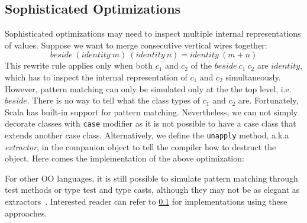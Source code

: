 \subsection{Sophisticated Optimizations}
Sophisticated optimizations may need to inspect multiple internal
representations of values.
Suppose we want to merge consecutive vertical wires together:
$$
beside\ (identity\ m)\ (identity\ n) = identity\ (m + n)
$$
This rewrite rule applies only when both $c_1$ and $c_2$ of the $beside\ c_1\ c_2$
are $identity$, which has to inspect the internal representation of $c_1$ and $c_2$ simultaneously.
However, pattern matching can only be simulated only at the the top level, i.e. $beside$.
There is no way to tell what the class types of $c_1$ and $c_2$ are.
Fortunately, Scala has built-in support for pattern matching. Nevertheless, we
can not simply decorate classes with \lstinline{case} modifier as
it is not possible to have a case class that extends another case class.
Alternatively, we define the \lstinline{unapply} method, a.k.a \emph{extractor}, in the companion object
to tell the compiler how to destruct the object. Here comes the implementation
of the above optimization:

For other OO languages, it is still possible to simulate
pattern matching through test methods or type test and type casts,
although they may not be as elegant as extractors~\cite{emir2007matching}.
Interested reader can refer to \ref{} for implementations using these approaches.

